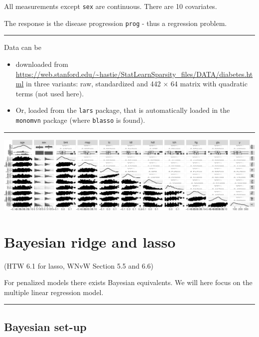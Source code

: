 \documentclass[
  letterpaper,
  DIV=11,
  numbers=noendperiod]{scrartcl}
\providecommand{\tightlist}{%
  \setlength{\itemsep}{0pt}\setlength{\parskip}{0pt}}\usepackage{longtable,booktabs,array}
\begin{document}
All measurements except \texttt{sex} are continuous. There are 10
covariates.

The response is the disease progression \texttt{prog} - thus a
regression problem.

\begin{center}\rule{0.5\linewidth}{0.5pt}\end{center}

Data can be

\begin{itemize}
\tightlist
\item
  downloaded from
  \url{https://web.stanford.edu/~hastie/StatLearnSparsity_files/DATA/diabetes.html}
  in three variants: raw, standardized and 442 \(\times\) 64 matrix with
  quadratic terms (not used here).
\item
  Or, loaded from the \texttt{lars} package, that is automatically
  loaded in the \texttt{monomvn} package (where \texttt{blasso} is
  found).
\end{itemize}

\begin{center}\rule{0.5\linewidth}{0.5pt}\end{center}

\includegraphics{W6_files/figure-pdf/unnamed-chunk-5-1.pdf}

\hypertarget{bayesian-ridge-and-lasso}{%
\section{Bayesian ridge and lasso}\label{bayesian-ridge-and-lasso}}

(HTW 6.1 for lasso, WNvW Section 5.5 and 6.6)

For penalized models there exists Bayesian equivalents. We will here
focus on the multiple linear regression model.

\begin{center}\rule{0.5\linewidth}{0.5pt}\end{center}

\hypertarget{bayesian-set-up}{%
\subsection{Bayesian set-up}\label{bayesian-set-up}}
\end{document}
